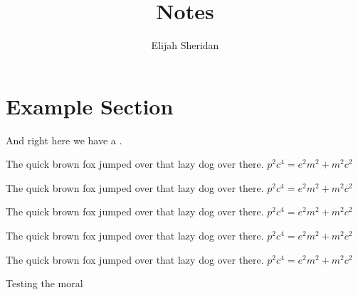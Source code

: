 \documentclass{article}
\title{Notes}
\author{Elijah Sheridan}
\begin{document}
\maketitle
\tableofcontents
\newpage

\section{Example Section}

And right here we have a .

\begin{define}[Test]
The quick brown fox jumped over that lazy dog over there. $p^2c^4 = e^2m^2 + m^2c^2$
\end{define}

\begin{theo}[Test]
The quick brown fox jumped over that lazy dog over there. $p^2c^4 = e^2m^2 + m^2c^2$

\end{theo}

\begin{res}[Test]
The quick brown fox jumped over that lazy dog over there. $p^2c^4 = e^2m^2 + m^2c^2$

\end{res}

\begin{cor}[Test]
The quick brown fox jumped over that lazy dog over there. $p^2c^4 = e^2m^2 + m^2c^2$

\end{cor}

\begin{ex}[Test]
The quick brown fox jumped over that lazy dog over there. $p^2c^4 = e^2m^2 + m^2c^2$
\end{ex}

\begin{moral}
Testing the moral
\end{moral}
\end{document}
